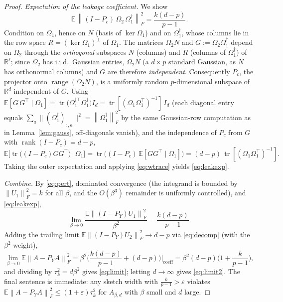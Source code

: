 \documentclass{amsart}
\theoremstyle{definition}
\DeclareMathOperator{\rank}{rank}
\DeclareMathOperator{\range}{range}
\DeclareMathOperator{\tr}{tr}
\newcommand{\R}{\mathbb{R}}
\newcommand{\Frob}[1]{\left\lVert #1\right\rVert_F}
\newcommand{\E}{\mathbb{E}}
\begin{document}
\begin{proof}
\emph{Expectation of the leakage coefficient.} We show
\begin{equation}\label{eq:leakexp}
\E\,\Frob{(I-P_c)\,\Omega_2\,\Omega_1^{\dagger}}^2=\frac{k(d-p)}{p-1}.
\end{equation}
Condition on $\Omega_1$, hence on $N$ (basis of $\ker\Omega_1$) and on
$\Omega_1^{\dagger}$, whose columns lie in the row space $R=(\ker\Omega_1)^\perp$
of $\Omega_1$. The matrices $\Omega_2N$ and $G:=\Omega_2\Omega_1^{\dagger}$
depend on $\Omega_2$ through the \emph{orthogonal} subspaces
$N$ (columns) and $R$ (columns of $\Omega_1^{\dagger}$) of $\R^{\ell}$;
since $\Omega_2$ has i.i.d.\ Gaussian entries, $\Omega_2N$ (a $d\times p$
standard Gaussian, as $N$ has orthonormal columns) and $G$ are therefore
\emph{independent}. Consequently $P_c$, the projector onto $\range(\Omega_2N)$,
is a uniformly random $p$-dimensional subspace of $\R^d$ independent of $G$.
Using $\E[G\,G^\top\mid\Omega_1]=\tr\!\big(\Omega_1^{\dagger\top}\Omega_1^{\dagger}\big)I_d
=\tr[(\Omega_1\Omega_1^\top)^{-1}]\,I_d$ (each diagonal entry equals
$\sum_a\|(\Omega_1^{\dagger})_{:,a}\|^2=\Frob{\Omega_1^{\dagger}}^2$ by the same
Gaussian-row computation as in Lemma~\ref{lem:gauss}, off-diagonals vanish), and
the independence of $P_c$ from $G$ with $\rank(I-P_c)=d-p$,
\[
\E\big[\tr\!\big((I-P_c)GG^\top\big)\,\big|\,\Omega_1\big]
=\tr\!\big((I-P_c)\,\E[GG^\top\mid\Omega_1]\big)
=(d-p)\,\tr[(\Omega_1\Omega_1^\top)^{-1}].
\]
Taking the outer expectation and applying \eqref{eq:wtrace} yields
\eqref{eq:leakexp}.

\emph{Combine.} By \eqref{eq:pert}, dominated convergence (the integrand is
bounded by $\Frob{U_1}^2=k$ for all $\beta$, and the $O(\beta^3)$ remainder is
uniformly controlled), and \eqref{eq:leakexp},
\[
\lim_{\beta\to0}\frac{\E\Frob{(I-P_Y)U_1}^2}{\beta^2}=\frac{k(d-p)}{p-1}.
\]
Adding the trailing limit $\E\Frob{(I-P_Y)U_2}^2\to d-p$ via
\eqref{eq:decomp} (with the $\beta^2$ weight),
\[
\lim_{\beta\to0}\E\Frob{A-P_YA}^2
=\beta^2\Big(\frac{k(d-p)}{p-1}+(d-p)\Big)\Big|_{\text{coeff}}
=\beta^2(d-p)\Big(1+\frac{k}{p-1}\Big),
\]
and dividing by $\tau_k^2=d\beta^2$ gives \eqref{eq:limit}; letting
$d\to\infty$ gives \eqref{eq:limit2}. The final sentence is immediate: any
sketch width with $\frac{k}{p-1}>\varepsilon$ violates
$\E\Frob{A-P_YA}^2\le(1+\varepsilon)\tau_k^2$ for $A_{\beta,d}$ with $\beta$
small and $d$ large.
\end{proof}
\end{document}
